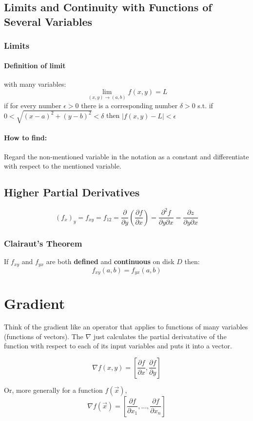 \documentclass[a4paper,12pt]{report}
\begin{document}
\subsection{Limits and Continuity with Functions of Several Variables}
\subsubsection{Limits}
\paragraph{Definition of limit } with many variables:
$$\lim_{(x, y) \to (a, b)} f(x, y) = L$$
if for every number $\epsilon > 0$ there is a corresponding number $\delta > 0$ s.t.
if $0 < \sqrt{(x-a)^2 + (y-b)^2} < \delta$ then $|f(x, y) - L | < \epsilon$

\paragraph{How to find: }
Regard the non-mentioned variable in the notation as a constant and differentiate with respect to the mentioned variable.

\subsection{Higher Partial Derivatives}
$$(f_x)_y = f_{xy} = f_{12} = \frac{\partial}{\partial y} (\frac{\partial f}{\partial x}) = \frac{\partial ^2 f}{\partial y \partial x} = \frac{\partial z}{\partial y \partial x}$$

\subsubsection{Clairaut's Theorem}
If $f_{xy}$ and $f_{yx}$ are both \textbf{defined} and \textbf{continuous} on disk $D$ then:
$$f_{xy}(a, b) = f_{yx}(a, b)$$

\section{Gradient}
Think of the gradient like an operator that applies to functions of many variables (functions of vectors). The $\nabla$
just calculates the partial derivatative of the function with respect to each of its input variables and puts it
into a vector.

$$\nabla f(x, y) = [\frac{\partial f}{\partial x}, \frac{\partial f}{\partial y}]$$

Or, more generally for a function $f(\vec{x})$, $$\nabla f(\vec{x}) = [\frac{\partial f}{\partial x_1}, ... , 
\frac{\partial f}{\partial x_n}]$$
\end{document}

